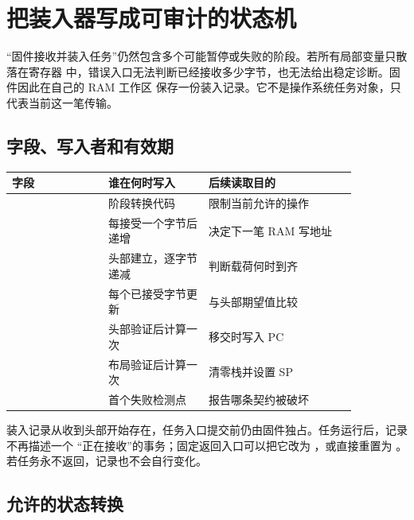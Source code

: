 \section{把装入器写成可审计的状态机}

“固件接收并装入任务”仍然包含多个可能暂停或失败的阶段。若所有局部变量只散落在寄存器
中，错误入口无法判断已经接收多少字节，也无法给出稳定诊断。固件因此在自己的 RAM 工作区
保存一份装入记录。它不是操作系统任务对象，只代表当前这一笔传输。

\subsection{字段、写入者和有效期}

\begin{longtable}{|L{0.24\linewidth}|L{0.25\linewidth}|L{0.37\linewidth}|}
\hline
{}
字段 & 谁在何时写入 & 后续读取目的 \\ \hline
{} & 阶段转换代码 & 限制当前允许的操作 \\ \hline
{} & 每接受一个字节后递增 & 决定下一笔 RAM 写地址 \\ \hline
{} & 头部建立，逐字节递减 & 判断载荷何时到齐 \\ \hline
{} & 每个已接受字节更新 & 与头部期望值比较 \\ \hline
{} & 头部验证后计算一次 & 移交时写入 PC \\ \hline
{} & 布局验证后计算一次 & 清零栈并设置 SP \\ \hline
{} & 首个失败检测点 & 报告哪条契约被破坏 \\ \hline
\end{longtable}

装入记录从收到头部开始存在，任务入口提交前仍由固件独占。任务运行后，记录不再描述一个
“正在接收”的事务；固定返回入口可以把它改为 ，或直接重置为
。若任务永不返回，记录也不会自行变化。

\subsection{允许的状态转换}

